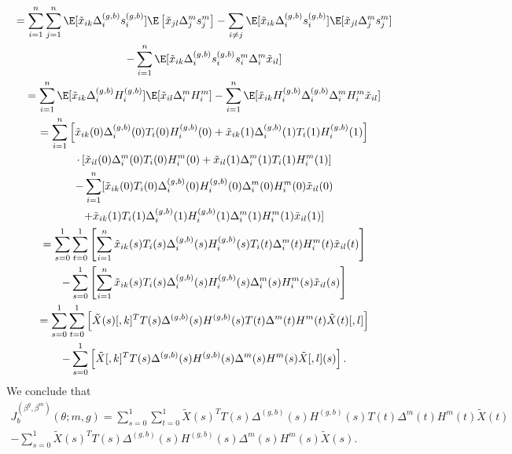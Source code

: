 \documentclass[12pt]{article}
\begin{document}
\begin{appendices}
\begin{multline*}
= \sum_{i=1}^n \sum_{j=1}^n \E[ \tilde{x}_{ik} \Delta^{(g,b)}_i s^{(g,b)}_i] \E \left[\tilde{x}_{jl} \Delta^m_j s^m_j \right]  - \sum_{i \neq j} \E[\tilde{x}_{ik} \Delta^{(g,b)}_i s^{(g,b)}_i] \E[\tilde{x}_{jl}\Delta^m_j  s^m_j ] \\ - \sum_{i=1}^n \E[\tilde{x}_{ik} \Delta^{(g,b)}_i s^{(g,b)}_i s^m_i \Delta^m_i \tilde{x}_{il}] \\
= \sum_{i=1}^n \E[\tilde{x}_{ik} \Delta^{(g,b)}_i H^{(g,b)}_i] \E[\tilde{x}_{il} \Delta_i^m H^m_i] - \sum_{i=1}^n \E[\tilde{x}_{ik} H_i^{(g,b)} \Delta_i^{(g,b)} \Delta_i^m H_i^m \tilde{x}_{il}] \\ 
= \sum_{i=1}^n \left[\tilde{x}_{ik}(0) {\Delta}^{(g,b)}_i(0) T_i(0) {H}^{(g,b)}_i(0) + \tilde{x}_{ik}(1) {\Delta}^{(g,b)}_i(1) T_i(1) {H}^{(g,b)}_i(1)\right] \\ 
\cdot \left[\tilde{x}_{il}(0) {\Delta}^m_i(0) T_i(0) {H}^m_i(0) + \tilde{x}_{il}(1) {\Delta}^m_i(1) T_i(1) {H}^m_i(1)\right] 
\\ - \sum_{i=1}^n [\tilde{x}_{ik}(0) T_i(0) {\Delta}^{(g,b)}_i(0) {H}^{(g,b)}_i(0) {\Delta}^m_i(0) {H}^m_i(0) \tilde{x}_{il}(0) \\ + \tilde{x}_{ik}(1) T_i(1) {\Delta}^{(g,b)}_i(1) {H}^{(g,b)}_i(1) {\Delta}^m_i(1) {H}^m_i(1) \tilde{x}_{il}(1) ] 
\\ = \sum_{s=0}^1 \sum_{t=0}^1 \left[\sum_{i=1}^n \tilde{x}_{ik}(s) T_i(s) {\Delta}^{(g,b)}_i(s) {H}^{(g,b)}_i(s) T_i(t){\Delta}^m_i(t) {H}^m_i(t) \tilde{x}_{il}(t) \right]
\\ - \sum_{s=0}^1 \left[\sum_{i=1}^n \tilde{x}_{ik}(s) T_i(s) {\Delta}^{(g,b)}_i(s) {H}^{(g,b)}_i(s) {\Delta}^m_i(s) {H}^m_i(s) \tilde{x}_{il}(s)\right] 
\\ = \sum_{s=0}^1 \sum_{t=0}^1 \left[ \tilde{X}(s)[,k]^T {T}(s) {\Delta}^{(g,b)}(s) {H}^{(g,b)}(s) {T}(t){\Delta}^m(t) {H}^m(t) \tilde{X}(t)[,l] \right]\\ - \sum_{s=0}^1 \left[ \tilde{X}[,k]^T {T}(s) {\Delta}^{(g,b)}(s) {H}^{(g,b)}(s) {\Delta}^m(s) {H}^m(s) \tilde{X}[,l](s)\right].
\end{multline*}
We conclude that
\begin{multline}\label{sub_mat_4_formula_background}
J^{(\beta^g, \beta^m)}_b(\theta; m, g) = \sum_{s=0}^1 \sum_{t=0}^1 \tilde{X}(s)^T  {T}(s) {\Delta}^{(g,b)}(s) {H}^{(g,b)}(s) {T}(t){\Delta}^m(t) {H}^m(t) \tilde{X}(t) \\ - \sum_{s=0}^1 \tilde{X}(s)^T {T}(s) {\Delta}^{(g,b)}(s) {H}^{(g,b)}(s) {\Delta}^m(s) {H}^m(s) \tilde{X}(s).
\end{multline}
\\ \noindent


\end{appendices}
\end{document}
